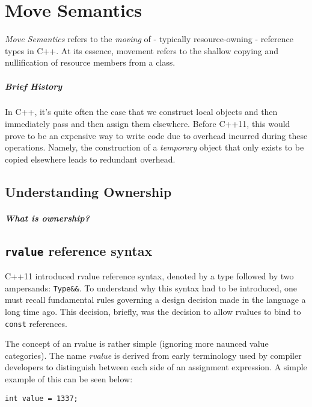 
\chapter{Move Semantics}

\textit{Move Semantics} refers to the \textit{moving} of - typically
resource-owning - reference types in C++. At its essence, movement refers to the
shallow copying and nullification of resource members from a class. 

\paragraph{Brief History}
In C++, it's quite often the case that we construct local objects and then
immediately pass and then assign them elsewhere. Before C++11, this would
prove to be an expensive way to write code due to overhead incurred during these
operations. Namely, the construction of a \textit{temporary} object that only
exists to be copied elsewhere leads to redundant overhead.

\section{Understanding Ownership}
	\paragraph{What is ownership?}

\section{\texttt{rvalue} reference syntax}

	C++11 introduced rvalue reference syntax, denoted by a type followed by two
	ampersands: \texttt{Type\&\&}. To understand why this syntax had to be
	introduced, one must recall fundamental rules governing a design decision
	made in the language a long time ago. This decision, briefly, was the
	decision to allow rvalues to bind to \texttt{const} references. 

	The concept of an rvalue is rather simple (ignoring more naunced value
	categories). The name \textit{rvalue} is derived from early terminology used
	by compiler developers to distinguish between each side of an assignment
	expression. A simple example of this can be seen below:

	\begin{verbatim}
int value = 1337;
	\end{verbatim}

